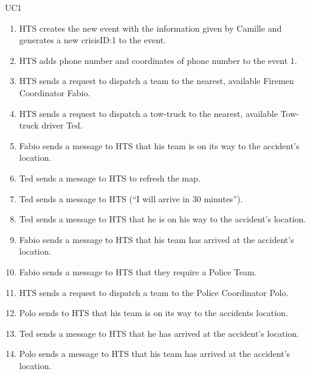 \begin{lyxlist}{UC1}
{\begin{enumerate}
  with the following information:
  \begin{enumerate}
  \item Walter (name)
  \item Witness (actor type)
  \item ``Highway carcrash with two cars involved'' (comment)
  \end{enumerate}
  \item HTS creates the new event with the information given by Camille and
  generates a new crisisID:1 to the event.
  \item HTS adds phone number and coordinates of phone number to the event 1.
  \item HTS sends a request to dispatch a team to the nearest, available Firemen
  Coordinator Fabio.
  \item HTS sends a request to dispatch a tow-truck to the nearest, available
  Tow-truck driver Ted.
  \item Fabio sends a message to HTS that his team is on its way to the
  accident’s location.
  \item Ted sends a message to HTS to refresh the map.
  \item Ted sends a message to HTS (``I will arrive in 30 minutes'').
  \item Ted sends a message to HTS that he is on his way to the accident’s
  location.
  \item Fabio sends a message to HTS that his team has arrived at the accident’s
  location.
  \item Fabio sends a message to HTS that they require a Police Team.
  \item HTS sends a request to dispatch a team to the Police Coordinator Polo.
  \item Polo sends to HTS that his team is on its way to the accidents
  location.
  \item Ted sends a message to HTS that he has arrived at the accident’s
  location.
  \item Polo sends a message to HTS that his team has arrived at the accident’s
  location.
\end{enumerate}
}
\end{lyxlist}



